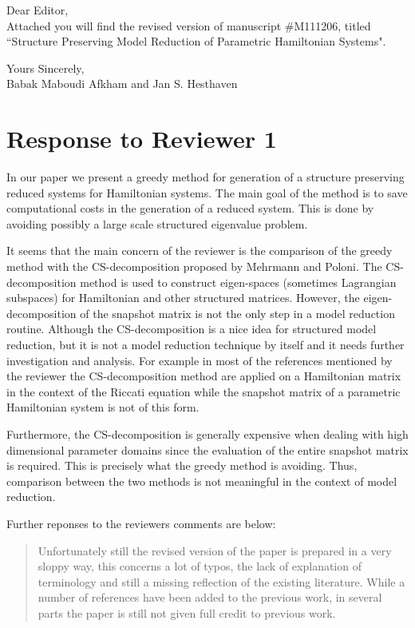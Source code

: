 \documentclass[a4paper]{article}
\newcommand{\breview}{\begin{quotation}\begin{bf}\noindent}
\newcommand{\ereview}{\end{bf}\end{quotation}}
\begin{document}
Dear Editor, \\[1cm]

Attached you will find the revised version of manuscript \#M111206, titled ``Structure Preserving Model Reduction of Parametric Hamiltonian Systems".

Yours Sincerely,\\[1.0cm]
Babak Maboudi Afkham and
Jan S. Hesthaven
\\[1cm]

\section*{Response to Reviewer 1}


In our paper we present a greedy method for generation of a structure preserving reduced systems for Hamiltonian systems. The main goal of the method is to save computational costs in the generation of a reduced system. This is done by avoiding possibly a large scale structured eigenvalue problem. 

It seems that the main concern of the reviewer is the comparison of the greedy method with the CS-decomposition proposed by Mehrmann and Poloni. The CS-decomposition method is used to construct eigen-spaces (sometimes Lagrangian subspaces) for Hamiltonian and other structured matrices. However, the eigen-decomposition of the snapshot matrix is not the only step in a model reduction routine. Although the CS-decomposition is a nice idea for structured model reduction, but it is not a model reduction technique by itself and it needs further investigation and analysis. For example in most of the references mentioned by the reviewer the CS-decomposition method are applied on a Hamiltonian matrix in the context of the Riccati equation while the snapshot matrix of a parametric Hamiltonian system is not of this form. 

Furthermore, the CS-decomposition is generally expensive when dealing with high dimensional parameter domains since the evaluation of the entire snapshot matrix is required. This is precisely what the greedy method is avoiding. Thus, comparison between the two methods is not meaningful in the context of model reduction.

Further reponses to the reviewers comments are below:
\breview
Unfortunately still the revised version of the paper is prepared in a very sloppy way, this concerns a lot of typos, the lack of explanation of terminology and still a missing reflection of the existing literature. While a number of references have been added to the previous work, in several parts the paper is still not given full credit to previous work.
\ereview
\end{document}
